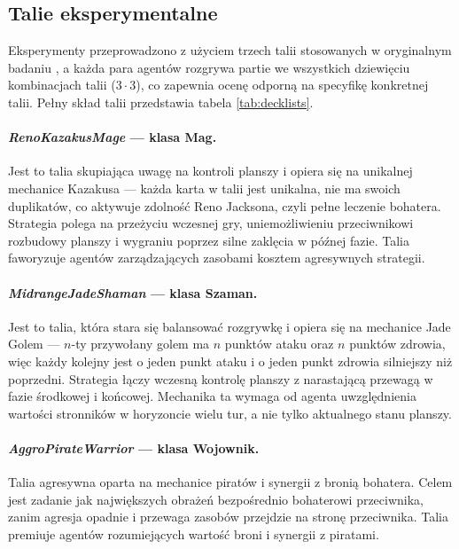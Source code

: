 \subsection{Talie eksperymentalne}

Eksperymenty przeprowadzono z użyciem trzech talii stosowanych w oryginalnym badaniu \cite{sanchez2020}, a każda para agentów rozgrywa partie we wszystkich dziewięciu kombinacjach talii ($3 \cdot 3$), co zapewnia ocenę odporną na specyfikę konkretnej talii. Pełny skład talii przedstawia tabela \ref{tab:decklists}.

\paragraph{\textit{RenoKazakusMage} --- klasa Mag.}
Jest to talia skupiająca uwagę na kontroli planszy i opiera się na unikalnej mechanice Kazakusa --- każda karta w talii jest unikalna, nie ma swoich duplikatów, co aktywuje zdolność Reno Jacksona, czyli pełne leczenie bohatera. Strategia polega na przeżyciu wczesnej gry, uniemożliwieniu przeciwnikowi rozbudowy planszy i wygraniu poprzez silne zaklęcia w późnej fazie. Talia faworyzuje agentów zarządzających zasobami kosztem agresywnych strategii.

\paragraph{\textit{MidrangeJadeShaman} --- klasa Szaman.}
Jest to talia, która stara się balansować rozgrywkę i opiera się na mechanice Jade Golem --- $n$-ty przywołany golem ma $n$ punktów ataku oraz $n$ punktów zdrowia, więc każdy kolejny jest o jeden punkt ataku i o jeden punkt zdrowia silniejszy niż poprzedni. Strategia łączy wczesną kontrolę planszy z narastającą przewagą w fazie środkowej i końcowej. Mechanika ta wymaga od agenta uwzględnienia wartości stronników w horyzoncie wielu tur, a nie tylko aktualnego stanu planszy.

\paragraph{\textit{AggroPirateWarrior} --- klasa Wojownik.}
Talia agresywna oparta na mechanice piratów i synergii z bronią bohatera. Celem jest zadanie jak największych obrażeń bezpośrednio bohaterowi przeciwnika, zanim agresja opadnie i przewaga zasobów przejdzie na stronę przeciwnika. Talia premiuje agentów rozumiejących wartość broni i synergii z piratami.

